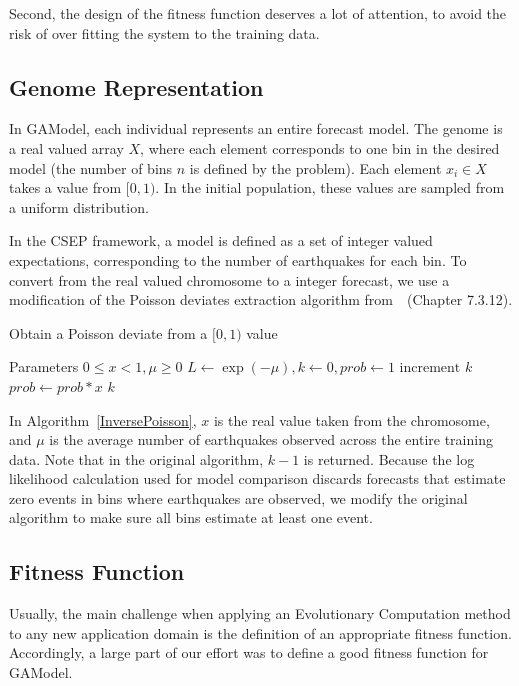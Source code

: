 \documentclass[a4paper,twoside]{article}
\begin{document}
Second, the design of the fitness function deserves a lot of
attention, to avoid the risk of over fitting the system to the
training data.

\subsection{Genome Representation}

In GAModel, each individual represents an entire forecast model. The
genome is a real valued array $X$, where each element corresponds to
one bin in the desired model (the number of bins $n$ is defined by the
problem). Each element $x_i \in X$ takes a value from $[0,1)$. In the
  initial population, these values are sampled from a uniform
  distribution.

In the CSEP framework, a model is defined as a set of integer valued
expectations, corresponding to the number of earthquakes for each
bin. To convert from the real valued chromosome to a integer forecast,
we use a modification of the Poisson deviates extraction algorithm
from~\cite{NumericalRecipes}~(Chapter 7.3.12).

\begin{algorithm}
  \caption{Obtain a Poisson deviate from a $[0,1)$ value}
  \label{InversePoisson}
  \begin{algorithmic}
    \STATE Parameters $0 \leq x < 1, \mu \geq 0$
    \STATE $L \gets \exp{(-\mu)}, k \gets 0, prob \gets 1$
    \REPEAT 
    \STATE $\text{increment }k$
    \STATE $prob \gets prob*x$
    \RETURN $k$
  \end{algorithmic}
\end{algorithm}

In Algorithm~\ref{InversePoisson}, $x$ is the real value taken from
the chromosome, and $\mu$ is the average number of earthquakes
observed across the entire training data. Note that in the original
algorithm, $k-1$ is returned. Because the log likelihood calculation
used for model comparison discards forecasts that estimate zero events
in bins where earthquakes are observed, we modify the original
algorithm to make sure all bins estimate at least one event.

\subsection{Fitness Function}

Usually, the main challenge when applying an Evolutionary Computation
method to any new application domain is the definition of an
appropriate fitness function. Accordingly, a large part of our effort
was to define a good fitness function for GAModel.
\end{document}

